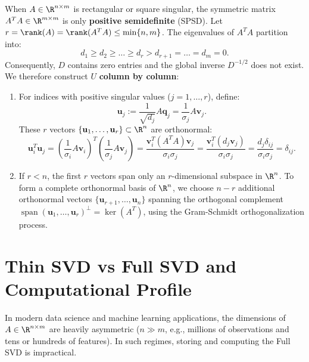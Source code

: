 When $A \in \R^{n \times m}$ is rectangular or square singular, the symmetric matrix $A^T A \in \R^{m \times m}$ is only \textbf{positive semidefinite} (SPSD).
Let $r = \rank(A) = \rank(A^T A) \le \min\{n, m\}$. The eigenvalues of $A^T A$ partition into:
\begin{equation}
    d_1 \ge d_2 \ge \dots \ge d_r > d_{r+1} = \dots = d_m = 0.
\end{equation}
Consequently, $D$ contains zero entries and the global inverse $D^{-1/2}$ does not exist. We therefore construct $U$ \textbf{column by column}:
\begin{enumerate}
    \item For indices with positive singular values ($j = 1, \dots, r$), define:
    \begin{equation}
        \mathbf{u}_j := \frac{1}{\sqrt{d_j}} A \mathbf{q}_j = \frac{1}{\sigma_j} A \mathbf{v}_j.
    \end{equation}
    These $r$ vectors $\{\mathbf{u}_1, \dots, \mathbf{u}_r\} \subset \R^n$ are orthonormal:
    \begin{equation}
        \mathbf{u}_i^T \mathbf{u}_j = \left(\frac{1}{\sigma_i} A \mathbf{v}_i\right)^T \left(\frac{1}{\sigma_j} A \mathbf{v}_j\right) = \frac{\mathbf{v}_i^T (A^T A) \mathbf{v}_j}{\sigma_i \sigma_j} = \frac{\mathbf{v}_i^T (d_j \mathbf{v}_j)}{\sigma_i \sigma_j} = \frac{d_j \delta_{ij}}{\sigma_i \sigma_j} = \delta_{ij}.
    \end{equation}
    \item If $r < n$, the first $r$ vectors span only an $r$-dimensional subspace in $\R^n$. To form a complete orthonormal basis of $\R^n$, we choose $n - r$ additional orthonormal vectors $\{\mathbf{u}_{r+1}, \dots, \mathbf{u}_n\}$ spanning the orthogonal complement $\operatorname{span}(\mathbf{u}_1, \dots, \mathbf{u}_r)^\perp = \ker(A^T)$, using the Gram-Schmidt orthogonalization process.
\end{enumerate}

\FloatBarrier
\section{Thin SVD vs Full SVD and Computational Profile}
\label{sec:svd-thin-vs-full-en}

In modern data science and machine learning applications, the dimensions of $A \in \R^{n \times m}$ are heavily asymmetric ($n \gg m$, e.g., millions of observations and tens or hundreds of features). In such regimes, storing and computing the Full SVD is impractical.

